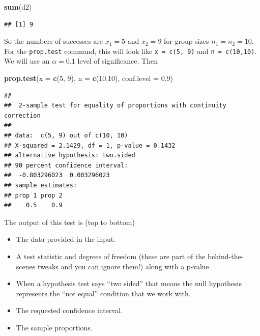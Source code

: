 \documentclass[
]{book}
\newenvironment{Shaded}{\begin{snugshade}}{\end{snugshade}}
\newcommand{\AttributeTok}[1]{\textcolor[rgb]{0.13,0.29,0.53}{#1}}
\newcommand{\DecValTok}[1]{\textcolor[rgb]{0.00,0.00,0.81}{#1}}
\newcommand{\FloatTok}[1]{\textcolor[rgb]{0.00,0.00,0.81}{#1}}
\newcommand{\FunctionTok}[1]{\textcolor[rgb]{0.13,0.29,0.53}{\textbf{#1}}}
\newcommand{\NormalTok}[1]{#1}
\providecommand{\tightlist}{%
  \setlength{\itemsep}{0pt}\setlength{\parskip}{0pt}}
\begin{document}
\begin{Shaded}
\begin{Highlighting}[]
\FunctionTok{sum}\NormalTok{(d2)}
\end{Highlighting}
\end{Shaded}

\begin{verbatim}
## [1] 9
\end{verbatim}

So the numbers of successes are \(x_1 = 5\) and \(x_2 = 9\) for group sizes \(n_1 = n_2 = 10\). For the \texttt{prop.test} command, this will look like \texttt{x\ =\ c(5,\ 9)} and \texttt{n\ =\ c(10,10)}. We will use an \(\alpha=0.1\) level of significance. Then

\begin{Shaded}
\begin{Highlighting}[]
\FunctionTok{prop.test}\NormalTok{(}\AttributeTok{x =} \FunctionTok{c}\NormalTok{(}\DecValTok{5}\NormalTok{, }\DecValTok{9}\NormalTok{), }\AttributeTok{n =} \FunctionTok{c}\NormalTok{(}\DecValTok{10}\NormalTok{,}\DecValTok{10}\NormalTok{), }\AttributeTok{conf.level =} \FloatTok{0.9}\NormalTok{)}
\end{Highlighting}
\end{Shaded}

\begin{verbatim}
## 
##  2-sample test for equality of proportions with continuity correction
## 
## data:  c(5, 9) out of c(10, 10)
## X-squared = 2.1429, df = 1, p-value = 0.1432
## alternative hypothesis: two.sided
## 90 percent confidence interval:
##  -0.803296023  0.003296023
## sample estimates:
## prop 1 prop 2 
##    0.5    0.9
\end{verbatim}

The output of this test is (top to bottom)

\begin{itemize}
\tightlist
\item
  The data provided in the input.
\item
  A test statistic and degrees of freedom (these are part of the behind-the-scenes tweaks and you can ignore them!) along with a p-value.
\item
  When a hypothesis test says ``two sided'' that means the null hypothesis represents the ``not equal'' condition that we work with.
\item
  The requested confidence interval.
\item
  The sample proportions.
\end{itemize}
\end{document}
